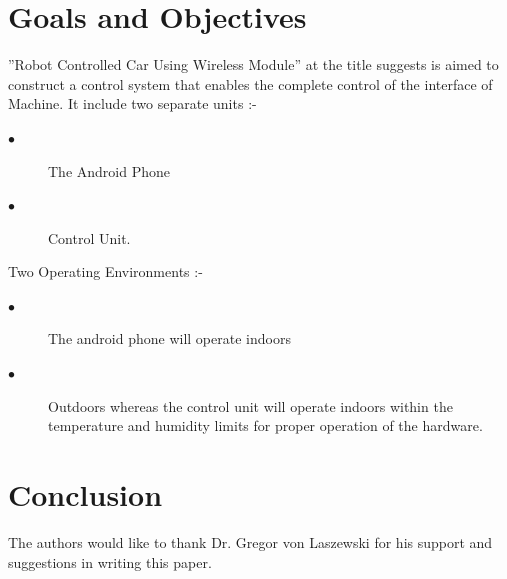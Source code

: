 \documentclass[sigconf]{acmart}
\begin{document}
\section{Goals and Objectives}
''Robot Controlled Car Using Wireless Module'' at the title
suggests is aimed to construct a control system that enables the
complete control of the interface of Machine.
It include two separate units :-
\begin{description}
\item[$\bullet$] The Android Phone

\item[$\bullet$] Control Unit.
\end{description}
Two Operating Environments :-
\begin{description}
\item[$\bullet$] The android phone will operate indoors

\item[$\bullet$] Outdoors whereas the control unit will operate
indoors within the temperature and humidity limits for proper
operation of the hardware.
\end{description}




\section{Conclusion}

\begin{acks}

The authors would like to thank Dr. Gregor von Laszewski for his support and suggestions in writing this paper.

\end{acks}

%
% 
\end{document}
